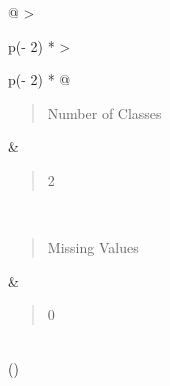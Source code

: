 \documentclass[
]{article}
\begin{document}
\begin{longtable}[]{@{}
  >{\raggedright\arraybackslash}p{(\columnwidth - 2\tabcolsep) * }
  >{\raggedright\arraybackslash}p{(\columnwidth - 2\tabcolsep) * }@{}}
\begin{minipage}[t]{\linewidth}
\begin{quote}
Number of Classes
\end{quote}
\end{minipage} & \begin{minipage}[t]{\linewidth}\raggedright
\begin{quote}
2
\end{quote}
\end{minipage} \\
\begin{minipage}[t]{\linewidth}\raggedright
\begin{quote}
Missing Values
\end{quote}
\end{minipage} & \begin{minipage}[t]{\linewidth}\raggedright
\begin{quote}
0
\end{quote}
\end{minipage} \\
\bottomrule()
\end{longtable}
\end{document}
